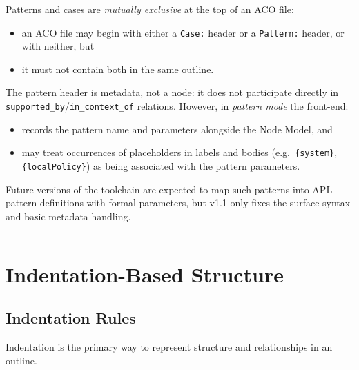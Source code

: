 \documentclass[11pt]{article}
\begin{document}
Patterns and cases are \emph{mutually exclusive} at the top of an ACO file:
\begin{itemize}[leftmargin=2em]
  \item an ACO file may begin with either a \texttt{Case:} header or a \texttt{Pattern:} header, or with neither, but
  \item it must not contain both in the same outline.
\end{itemize}

The pattern header is metadata, not a node: it does not participate directly in \texttt{supported\_by}/\texttt{in\_context\_of} relations. However, in \emph{pattern mode} the front-end:
\begin{itemize}[leftmargin=2em]
  \item records the pattern name and parameters alongside the Node Model, and
  \item may treat occurrences of placeholders in labels and bodies (e.g.\ \texttt{\{system\}}, \texttt{\{localPolicy\}}) as being associated with the pattern parameters.
\end{itemize}

Future versions of the toolchain are expected to map such patterns into APL pattern definitions with formal parameters, but v1.1 only fixes the surface syntax and basic metadata handling.
\endgroup

\bigskip
\hrule
\bigskip

\section{Indentation-Based Structure}

\subsection{Indentation Rules}

Indentation is the primary way to represent structure and relationships in an outline.
\end{document}
